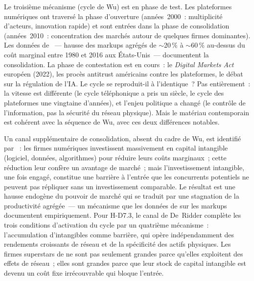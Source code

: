 Le troisième mécanisme (cycle de Wu) est en phase de test. Les plateformes numériques ont traversé la phase d'ouverture (années~2000~: multiplicité d'acteurs, innovation rapide) et sont entrées dans la phase de consolidation (années~2010~: concentration des marchés autour de quelques firmes dominantes). Les données de \textcite{deloecker_rise_2020}~--- hausse des markups agrégés de $\sim$20\,\% à $\sim$60\,\% au-dessus du coût marginal entre 1980 et 2016 aux États-Unis~--- documentent la consolidation. La phase de contestation est en cours~: le \emph{Digital Markets Act} européen (2022), les procès antitrust américains contre les plateformes, le débat sur la régulation de l'IA. Le cycle se reproduit-il à l'identique~? Pas entièrement~: la vitesse est différente (le cycle téléphonique a pris un siècle, le cycle des plateformes une vingtaine d'années), et l'enjeu politique a changé (le contrôle de l'information, pas la sécurité du réseau physique). Mais le matériau contemporain est cohérent avec la séquence de Wu, avec ces deux différences notables.

Un canal supplémentaire de consolidation, absent du cadre de Wu, est identifié par \textcite{de_ridder_2024}~: les firmes numériques investissent massivement en capital intangible (logiciel, données, algorithmes) pour réduire leurs coûts marginaux~; cette réduction leur confère un avantage de marché~; mais l'investissement intangible, une fois engagé, constitue une barrière à l'entrée que les concurrents potentiels ne peuvent pas répliquer sans un investissement comparable. Le résultat est une hausse endogène du pouvoir de marché qui se traduit par une stagnation de la productivité agrégée~--- un mécanisme que les données de \textcite{deloecker_rise_2020} sur les markups documentent empiriquement. Pour H-D7.3, le canal de De~Ridder complète les trois conditions d'activation du cycle par un quatrième mécanisme~: l'accumulation d'intangibles comme barrière, qui opère indépendamment des rendements croissants de réseau et de la spécificité des actifs physiques. Les firmes superstars de \textcite{autor_fall_2020} ne sont pas seulement grandes parce qu'elles exploitent des effets de réseau~; elles sont grandes parce que leur stock de capital intangible est devenu un coût fixe irrécouvrable qui bloque l'entrée.



